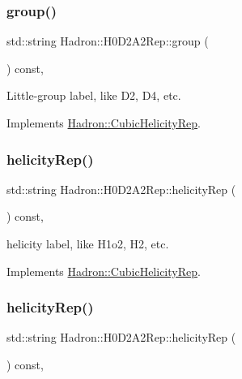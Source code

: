 \subsubsection{\texorpdfstring{group()}{group()}\hspace{0.1cm}{\footnotesize\ttfamily [5/5]}}
{\footnotesize\ttfamily std\+::string Hadron\+::\+H0\+D2\+A2\+Rep\+::group (\begin{DoxyParamCaption}{ }\end{DoxyParamCaption}) const\hspace{0.3cm}{\ttfamily [inline]}, {\ttfamily [virtual]}}

Little-\/group label, like D2, D4, etc. 

Implements \mbox{\hyperlink{structHadron_1_1CubicHelicityRep_a101a7d76cd8ccdad0f272db44b766113}{Hadron\+::\+Cubic\+Helicity\+Rep}}.

\mbox{\label{structHadron_1_1H0D2A2Rep_aa9316edf57dc396c9ff64b842985aa33}} 
\subsubsection{\texorpdfstring{helicityRep()}{helicityRep()}\hspace{0.1cm}{\footnotesize\ttfamily [1/3]}}
{\footnotesize\ttfamily std\+::string Hadron\+::\+H0\+D2\+A2\+Rep\+::helicity\+Rep (\begin{DoxyParamCaption}{ }\end{DoxyParamCaption}) const\hspace{0.3cm}{\ttfamily [inline]}, {\ttfamily [virtual]}}

helicity label, like H1o2, H2, etc. 

Implements \mbox{\hyperlink{structHadron_1_1CubicHelicityRep_af1096946b7470edf0a55451cc662f231}{Hadron\+::\+Cubic\+Helicity\+Rep}}.

\mbox{\label{structHadron_1_1H0D2A2Rep_aa9316edf57dc396c9ff64b842985aa33}} 
\subsubsection{\texorpdfstring{helicityRep()}{helicityRep()}\hspace{0.1cm}{\footnotesize\ttfamily [2/3]}}
{\footnotesize\ttfamily std\+::string Hadron\+::\+H0\+D2\+A2\+Rep\+::helicity\+Rep (\begin{DoxyParamCaption}{ }\end{DoxyParamCaption}) const\hspace{0.3cm}{\ttfamily [inline]}, {\ttfamily [virtual]}}

